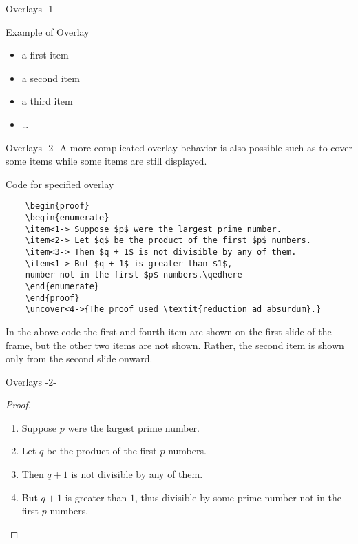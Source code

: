 \documentclass[10pt,xcolor=x11names]{beamer}
\begin{document}
\begin{frame}{ Overlays -1-}
\begin{exampleblock}{Example of Overlay}
\begin{itemize}[<+->]
\item a first item
\item a second item
\item a third item
\item \dots
\end{itemize}
\end{exampleblock}
\end{frame}

\begin{frame}[containsverbatim]{ Overlays -2-} 
A more complicated overlay behavior is also possible such as to cover some items while some items are still displayed.
{\footnotesize 
\begin{exampleblock}{Code for specified overlay}
	\begin{verbatim}
	\begin{proof}
	\begin{enumerate}
	\item<1-> Suppose $p$ were the largest prime number.
	\item<2-> Let $q$ be the product of the first $p$ numbers.
	\item<3-> Then $q + 1$ is not divisible by any of them.
	\item<1-> But $q + 1$ is greater than $1$, 
	number not in the first $p$ numbers.\qedhere
	\end{enumerate}
	\end{proof}
	\uncover<4->{The proof used \textit{reduction ad absurdum}.}
	\end{verbatim}
\end{exampleblock} }

In the above code the first and fourth item are shown on the first slide of the frame, but the other two items are not shown. Rather, the second item is shown only from the second slide onward.
  
\end{frame}

\begin{frame}{Overlays -2-}
\begin{proof}
	\begin{enumerate}
		\item<1-> Suppose $p$ were the largest prime number.
		\item<2-> Let $q$ be the product of the first $p$ numbers.
		\item<3-> Then $q + 1$ is not divisible by any of them.
		\item<1-> But $q + 1$ is greater than $1$, thus divisible by some prime
		number not in the first $p$ numbers.\qedhere
	\end{enumerate}
\end{proof}
\end{frame}
\end{document}
